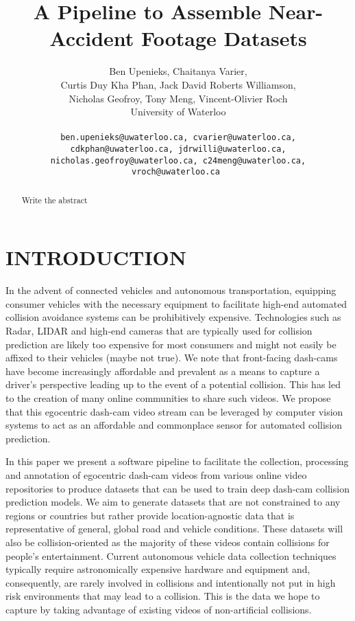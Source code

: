 \documentclass[letterpaper, 10 pt, conference]{IEEEconf}
\title{\LARGE \bf
A Pipeline to Assemble Near-Accident Footage Datasets
}
\author{
         Ben Upenieks, Chaitanya Varier,\\
         Curtis Duy Kha Phan, Jack David Roberts Williamson,\\
         Nicholas Geofroy, Tony Meng, Vincent-Olivier Roch\\
         University of Waterloo\\
         \\
         \tt\small ben.upenieks@uwaterloo.ca, cvarier@uwaterloo.ca,
         \\ \tt\small cdkphan@uwaterloo.ca, jdrwilli@uwaterloo.ca,
         \\ \tt\small nicholas.geofroy@uwaterloo.ca, c24meng@uwaterloo.ca, vroch@uwaterloo.ca
}
\newcommand{\todo}[1]{{\color{red}#1}}
\begin{document}
\maketitle
\thispagestyle{empty}
\pagestyle{empty}


\begin{abstract}

\todo{Write the abstract}

\end{abstract}

\section{INTRODUCTION}

In the advent of connected vehicles and autonomous transportation, equipping consumer vehicles with the necessary equipment to facilitate high-end automated collision avoidance systems can be prohibitively expensive.
Technologies such as Radar, LIDAR and high-end cameras that are typically used for collision prediction are likely too expensive for most consumers and might not easily be affixed to their vehicles (maybe not true).
We note that front-facing dash-cams have become increasingly affordable and prevalent as a means to capture a driver’s perspective leading up to the event of a potential collision.
This has led to the creation of many online communities to share such videos.
We propose that this egocentric dash-cam video stream can be leveraged by computer vision systems to act as an affordable and commonplace sensor for automated collision prediction. 

In this paper we present a software pipeline to facilitate the collection, processing and annotation of egocentric dash-cam videos from various online video repositories to produce datasets that can be used to train deep dash-cam collision prediction models.
We aim to generate datasets that are not constrained to any regions or countries but rather provide location-agnostic data that is representative of general, global road and vehicle conditions.
These datasets will also be collision-oriented as the majority of these videos contain collisions for people's entertainment.
Current autonomous vehicle data collection techniques typically require astronomically expensive hardware and equipment and, consequently, are rarely involved in collisions and intentionally not put in high risk environments that may lead to a collision.
This is the data we hope to capture by taking advantage of existing videos of non-artificial collisions.
\end{document}
